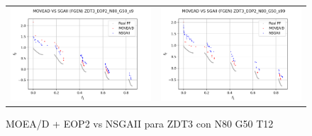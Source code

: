 \begin{figure}[H]
\begin{tabular}{c c}
    \includegraphics[scale=0.5]{figures/ZDT3_EOP2_N80_G50_T12/s9_comp.png} &
    \includegraphics[scale=0.5]{figures/ZDT3_EOP2_N80_G50_T12/s99_comp.png}\\
    \end{tabular}
    \caption{\centering MOEA/D + EOP2 vs NSGAII para ZDT3 con N80 G50 T12}
    \label{fig:15}
\end{figure}